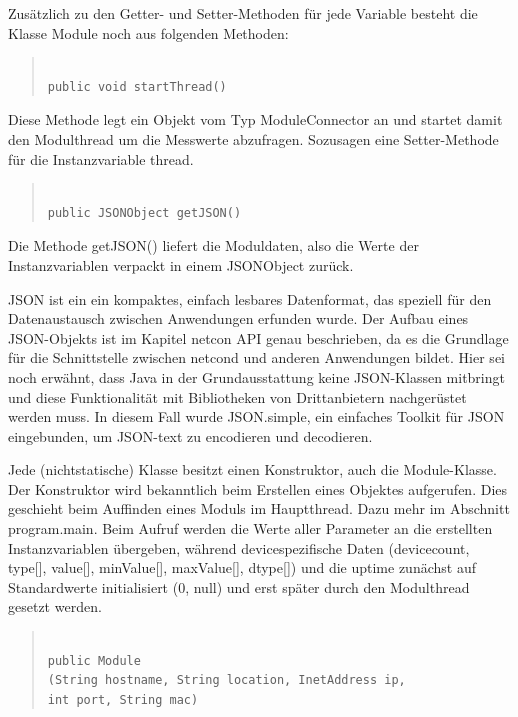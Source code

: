 \documentclass[a4paper,14pt,headsepline]{scrartcl}
\begin{document}
Zusätzlich zu den Getter- und Setter-Methoden für jede Variable besteht die Klasse Module noch aus folgenden Methoden:

\begin{quote}
\begin{verbatim}

public void startThread() 

\end{verbatim}
\end{quote}

Diese Methode legt ein Objekt vom Typ ModuleConnector an und startet damit den Modulthread um die Messwerte abzufragen. Sozusagen eine Setter-Methode für die Instanzvariable thread.  

\newpage

\begin{quote}
\begin{verbatim}

public JSONObject getJSON()

\end{verbatim}
\end{quote}

Die Methode getJSON() liefert die Moduldaten, also die Werte der Instanzvariablen verpackt in einem JSONObject zurück. 

JSON ist ein ein kompaktes, einfach lesbares Datenformat, das speziell für den Datenaustausch zwischen Anwendungen erfunden wurde. Der Aufbau eines JSON-Objekts ist im Kapitel netcon API genau beschrieben, da es die Grundlage für die Schnittstelle zwischen netcond und anderen Anwendungen bildet. Hier sei noch erwähnt, dass Java in der Grundausstattung keine JSON-Klassen mitbringt und diese Funktionalität mit Bibliotheken von Drittanbietern nachgerüstet werden muss. In diesem Fall wurde JSON.simple, ein einfaches Toolkit für JSON eingebunden, um JSON-text zu encodieren und decodieren.

Jede (nichtstatische) Klasse besitzt einen Konstruktor, auch die Module-Klasse. Der Konstruktor wird bekanntlich beim Erstellen eines Objektes aufgerufen. Dies geschieht beim Auffinden eines Moduls im Hauptthread. Dazu mehr im Abschnitt program.main. Beim Aufruf werden die Werte aller Parameter an die erstellten Instanzvariablen übergeben, während devicespezifische Daten (devicecount, type[], value[], minValue[], maxValue[], dtype[]) und die uptime zunächst auf Standardwerte initialisiert (0, null) und erst später durch den Modulthread gesetzt werden. 
\begin{quote}
\begin{verbatim}

public Module
(String hostname, String location, InetAddress ip, 
int port, String mac)

\end{verbatim}
\end{quote}
\end{document}
